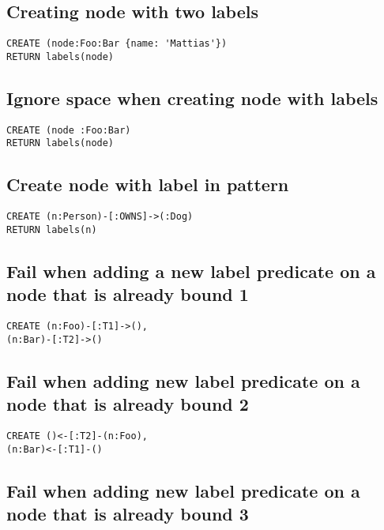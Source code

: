 \subsection{Creating node with two labels}

\begin{lstlisting}
CREATE (node:Foo:Bar {name: 'Mattias'})
RETURN labels(node)
\end{lstlisting}

\subsection{Ignore space when creating node with labels}

\begin{lstlisting}
CREATE (node :Foo:Bar)
RETURN labels(node)
\end{lstlisting}

\subsection{Create node with label in pattern}

\begin{lstlisting}
CREATE (n:Person)-[:OWNS]->(:Dog)
RETURN labels(n)
\end{lstlisting}

\subsection{Fail when adding a new label predicate on a node that is already bound 1}

\begin{lstlisting}
CREATE (n:Foo)-[:T1]->(),
(n:Bar)-[:T2]->()
\end{lstlisting}

\subsection{Fail when adding new label predicate on a node that is already bound 2}

\begin{lstlisting}
CREATE ()<-[:T2]-(n:Foo),
(n:Bar)<-[:T1]-()
\end{lstlisting}

\subsection{Fail when adding new label predicate on a node that is already bound 3}


